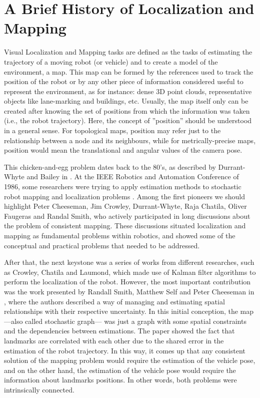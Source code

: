 \section{A Brief History of Localization and Mapping}
\label{sec:history}

Visual Localization and Mapping tasks are defined as the tasks of estimating the trajectory of a moving robot (or vehicle) and to create a model of the environment, \ie a map. This map can be formed by the references used to track the position of the robot or by any other piece of information considered useful to represent the environment, as for instance: dense 3D point clouds, representative objects like lane-marking and buildings, etc. Usually, the map itself only can be created after knowing the set of positions from which the information was taken (i.e., the robot trajectory). Here, the concept of ''position'' should be understood in a general sense. For topological maps, position may refer just to the relationship between a node and its neighbours, while for metrically-precise maps, position would mean the translational and angular values of the camera pose.

This chicken-and-egg problem dates back to the 80's, as described by Durrant-Whyte and Bailey in \cite{SLAM_SURVEY1}. At the IEEE Robotics and Automation Conference of 1986, some researchers were trying to apply estimation methods to stochastic robot mapping and localization problems \cite{SLAM_SURVEY1}. Among the first pioneers we should highlight Peter Cheeseman, Jim Crowley, Durrant-Whyte, Raja Chatila, Oliver Faugeras and Randal Smith, who actively participated in long discussions about the problem of consistent mapping. These discussions situated localization and mapping as fundamental problems within robotics, and showed some of the conceptual and practical problems that needed to be addressed.

After that, the next keystone was a series of works from different researches, such as Crowley, Chatila and Laumond, which made use of Kalman filter algorithms to perform the localization of the robot. However, the most important contribution was the work presented by Randall Smith, Matthew Self and Peter Cheeseman in \cite{Original}, where the authors described a way of managing and estimating spatial relationships with their respective uncertainty. In this initial conception, the map ---also called stochastic graph--- was just a graph with some spatial constraints and the dependencies between estimations. The paper showed the fact that landmarks are correlated with each other due to the shared error in the estimation of the robot trajectory. In this way, it comes up that any consistent solution of the mapping problem would require the estimation of the vehicle pose, and on the other hand, the estimation of the vehicle pose would require the information about landmarks positions. In other words, both problems were intrinsically connected. 

